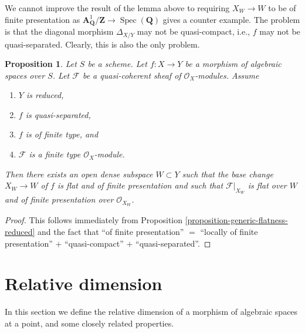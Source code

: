 \documentclass{stacks-project}
\theoremstyle{plain}
\newtheorem{proposition}[subsection]{Proposition}
\theoremstyle{definition}
\theoremstyle{remark}
\numberwithin{equation}{subsection}
\def\Spec{\mathop{\mathrm{Spec}}}
\begin{document}
\noindent
We cannot improve the result of the lemma above to requiring
$X_W \to W$ to be of finite presentation as
$\mathbf{A}^1_{\mathbf{Q}}/\mathbf{Z} \to \Spec(\mathbf{Q})$
gives a counter example. The problem is that the diagonal morphism
$\Delta_{X/Y}$ may not be quasi-compact, i.e., $f$ may not be
quasi-separated. Clearly, this is also the only problem.

\begin{proposition}
\label{proposition-generic-flatness-reduced-quasi-separated}
Let $S$ be a scheme.
Let $f : X \to Y$ be a morphism of algebraic spaces over $S$.
Let $\mathcal{F}$ be a quasi-coherent sheaf of $\mathcal{O}_X$-modules.
Assume
\begin{enumerate}
\item $Y$ is reduced,
\item $f$ is quasi-separated,
\item $f$ is of finite type, and
\item $\mathcal{F}$ is a finite type $\mathcal{O}_X$-module.
\end{enumerate}
Then there exists an open dense subspace $W \subset Y$ such that
the base change $X_W \to W$ of $f$ is flat and of finite presentation
and such that $\mathcal{F}|_{X_W}$ is flat over $W$ and of
finite presentation over $\mathcal{O}_{X_W}$.
\end{proposition}

\begin{proof}
This follows immediately from
Proposition \ref{proposition-generic-flatness-reduced}
and the fact that ``of finite presentation'' $=$
``locally of finite presentation'' $+$ ``quasi-compact'' $+$
``quasi-separated''.
\end{proof}















\section{Relative dimension}
\label{section-relative-dimension}

\noindent
In this section we define the relative dimension
of a morphism of algebraic spaces at a point, and some closely
related properties.
\end{document}
